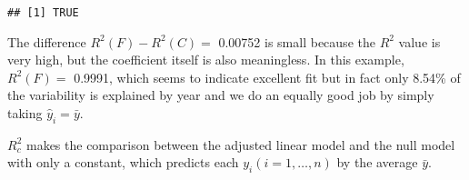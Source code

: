 \documentclass[]{book}
\newenvironment{Shaded}{\begin{snugshade}}{\end{snugshade}}
\newcommand{\CommentTok}[1]{\textcolor[rgb]{0.56,0.35,0.01}{\textit{#1}}}
\newcommand{\DecValTok}[1]{\textcolor[rgb]{0.00,0.00,0.81}{#1}}
\newcommand{\KeywordTok}[1]{\textcolor[rgb]{0.13,0.29,0.53}{\textbf{#1}}}
\newcommand{\NormalTok}[1]{#1}
\newcommand{\OperatorTok}[1]{\textcolor[rgb]{0.81,0.36,0.00}{\textbf{#1}}}
\newcommand{\StringTok}[1]{\textcolor[rgb]{0.31,0.60,0.02}{#1}}
\theoremstyle{definition}
\theoremstyle{definition}
\theoremstyle{definition}
\theoremstyle{remark}
\begin{document}
\begin{Shaded}
\end{Shaded}

\begin{verbatim}
## [1] TRUE
\end{verbatim}

The difference \(R^2(F)-R^2(C)=\) 0.00752 is small because the \(R^2\)
value is very high, but the coefficient itself is also meaningless. In
this example, \(R^2(F)=\) 0.9991, which seems to indicate excellent fit
but in fact only 8.54\% of the variability is explained by year and we
do an equally good job by simply taking \(\hat{y}_i=\bar{y}\).

\(R^2_c\) makes the comparison between the adjusted linear model and the
null model with only a constant, which predicts each
\(y_i (i=1, \ldots, n)\) by the average \(\bar{y}\).
\end{document}
